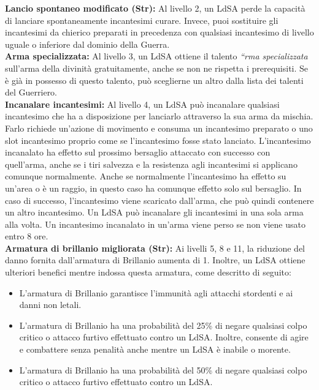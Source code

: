\documentclass[a4paper]{report}
\begin{document}
\begin{multicols}{2}
\textbf{Lancio spontaneo modificato (Str):} Al livello 2, un LdSA perde la capacità di lanciare spontaneamente incantesimi curare. Invece, puoi sostituire gli incantesimi da chierico preparati in precedenza con qualsiasi incantesimo di livello uguale o inferiore dal dominio della Guerra.\\

\textbf{Arma specializzata:} Al livello 3, un LdSA ottiene il talento \textit{“rma specializzata} sull’arma della divinità gratuitamente, anche se non ne rispetta i prerequisiti. Se è già in possesso di questo talento, può sceglierne un altro dalla lista dei talenti del Guerriero.\\

\textbf{Incanalare incantesimi:} Al livello 4, un LdSA può incanalare qualsiasi incantesimo che ha a disposizione per lanciarlo attraverso la sua arma da mischia. Farlo richiede un'azione di movimento e consuma un incantesimo preparato o uno slot incantesimo proprio come se l'incantesimo fosse stato lanciato. L'incantesimo incanalato ha effetto sul prossimo bersaglio attaccato con successo con quell'arma, anche se i tiri salvezza e la resistenza agli incantesimi si applicano comunque normalmente. Anche se normalmente l'incantesimo ha effetto su un'area o è un raggio, in questo caso ha comunque effetto solo sul bersaglio. In caso di successo, l'incantesimo viene scaricato dall'arma, che può quindi contenere un altro incantesimo. Un LdSA può incanalare gli incantesimi in una sola arma alla volta. Un incantesimo incanalato in un'arma viene perso se non viene usato entro 8 ore.\\

\textbf{Armatura di brillanio migliorata (Str):}  Ai livelli 5, 8 e 11, la riduzione del danno fornita dall’armatura di Brillanio aumenta di 1. Inoltre, un LdSA ottiene ulteriori benefici mentre indossa questa armatura, come descritto di seguito:
\begin{itemize}
	\item L’armatura di Brillanio garantisce l'immunità agli attacchi stordenti e ai danni non letali.
	\item L’armatura di Brillanio ha una probabilità del 25\% di negare qualsiasi colpo critico o attacco furtivo effettuato contro un LdSA. Inoltre, consente di agire e combattere senza penalità anche mentre un LdSA è inabile o morente.
	\item L’armatura di Brillanio ha una probabilità del 50\% di negare qualsiasi colpo critico o attacco furtivo effettuato contro un LdSA.
\end{itemize}


\end{multicols}
\end{document}
